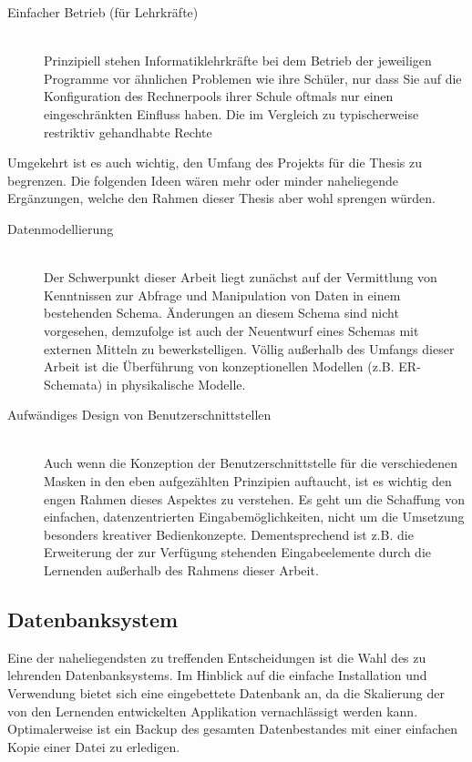 \documentclass[paper=a4,fontsize=11pt,parskip=half]{scrartcl}
\begin{document}
\begin{description}
\item[Einfacher Betrieb (für Lehrkräfte)] \hfill \\
  Prinzipiell stehen Informatiklehrkräfte bei dem Betrieb der jeweiligen Programme vor ähnlichen Problemen wie ihre Schüler, nur dass Sie auf die Konfiguration des Rechnerpools ihrer Schule oftmals nur einen eingeschränkten Einfluss haben. Die im Vergleich zu typischerweise restriktiv gehandhabte Rechte
  
\end{description}

Umgekehrt ist es auch wichtig, den Umfang des Projekts für die Thesis zu begrenzen. Die folgenden Ideen wären mehr oder minder naheliegende Ergänzungen, welche den Rahmen dieser Thesis aber wohl sprengen würden.

\begin{description}
\item[Datenmodellierung] \hfill \\
  Der Schwerpunkt dieser Arbeit liegt zunächst auf der Vermittlung von Kenntnissen zur Abfrage und Manipulation von Daten in einem bestehenden Schema. Änderungen an diesem Schema sind nicht vorgesehen, demzufolge ist auch der Neuentwurf eines Schemas mit externen Mitteln zu bewerkstelligen. Völlig außerhalb des Umfangs dieser Arbeit ist die Überführung von konzeptionellen Modellen (z.B. ER-Schemata) in physikalische Modelle.
\item[Aufwändiges Design von Benutzerschnittstellen] \hfill \\
  Auch wenn die Konzeption der Benutzerschnittstelle für die verschiedenen Masken in den eben aufgezählten Prinzipien auftaucht, ist es wichtig den engen Rahmen dieses Aspektes zu verstehen. Es geht um die Schaffung von einfachen, datenzentrierten Eingabemöglichkeiten, nicht um die Umsetzung besonders kreativer Bedienkonzepte. Dementsprechend ist z.B. die Erweiterung der zur Verfügung stehenden Eingabeelemente durch die Lernenden außerhalb des Rahmens dieser Arbeit.
\end{description}

\subsection{Datenbanksystem}

Eine der naheliegendsten zu treffenden Entscheidungen ist die Wahl des zu lehrenden Datenbanksystems. Im Hinblick auf die einfache Installation und Verwendung bietet sich eine eingebettete Datenbank an, da die Skalierung der von den Lernenden entwickelten Applikation vernachlässigt werden kann. Optimalerweise ist ein Backup des gesamten Datenbestandes mit einer einfachen Kopie einer Datei zu erledigen.
\end{document}
